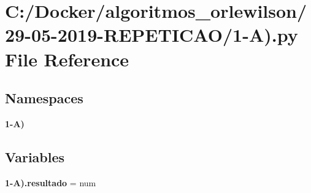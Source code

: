 \section{C\+:/\+Docker/algoritmos\+\_\+orlewilson/29-\/05-\/2019-\/\+R\+E\+P\+E\+T\+I\+C\+A\+O/1-\/A).py File Reference}
\label{1-_a_08_8py}
\subsection*{Namespaces}
\begin{DoxyCompactItemize}
\item 
 \textbf{ 1-\/\+A)}
\end{DoxyCompactItemize}
\subsection*{Variables}
\begin{DoxyCompactItemize}
\item 
\textbf{ 1-\/\+A).\+resultado} = num
\end{DoxyCompactItemize}
